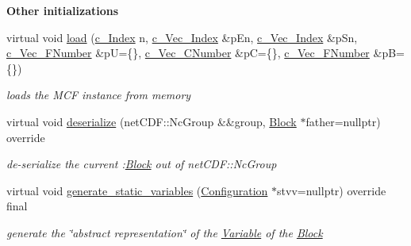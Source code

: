\begin{Indent}\textbf{ Other initializations}\par
\begin{DoxyCompactItemize}
\item 
virtual void \mbox{\hyperlink{class_s_m_spp__di__unipi__it_1_1_m_c_f_block_a8d9a0b09d14066840af26ec9189f6e03}{load}} (\mbox{\hyperlink{class_s_m_spp__di__unipi__it_1_1_m_c_f_block_aee6156e2ce80720d57a082d80f39d8cc}{c\+\_\+\+Index}} n, \mbox{\hyperlink{class_s_m_spp__di__unipi__it_1_1_m_c_f_block_a03461123d4f6090aefeb97ef653d3f2b}{c\+\_\+\+Vec\+\_\+\+Index}} \&p\+En, \mbox{\hyperlink{class_s_m_spp__di__unipi__it_1_1_m_c_f_block_a03461123d4f6090aefeb97ef653d3f2b}{c\+\_\+\+Vec\+\_\+\+Index}} \&p\+Sn, \mbox{\hyperlink{class_s_m_spp__di__unipi__it_1_1_m_c_f_block_ae74990406673bbcdf64e1a3e3b680d5c}{c\+\_\+\+Vec\+\_\+\+F\+Number}} \&pU=\{\}, \mbox{\hyperlink{class_s_m_spp__di__unipi__it_1_1_m_c_f_block_ad42538e79f9abbdf18061bccc05edcd6}{c\+\_\+\+Vec\+\_\+\+C\+Number}} \&pC=\{\}, \mbox{\hyperlink{class_s_m_spp__di__unipi__it_1_1_m_c_f_block_ae74990406673bbcdf64e1a3e3b680d5c}{c\+\_\+\+Vec\+\_\+\+F\+Number}} \&pB=\{\})
\begin{DoxyCompactList}\small\item\em loads the M\+CF instance from memory \end{DoxyCompactList}\item 
virtual void \mbox{\hyperlink{class_s_m_spp__di__unipi__it_1_1_m_c_f_block_a817e3ce47ea40c14517ec16c6b62b814}{deserialize}} (net\+C\+D\+F\+::\+Nc\+Group \&\&group, \mbox{\hyperlink{class_s_m_spp__di__unipi__it_1_1_block}{Block}} $\ast$father=nullptr) override
\begin{DoxyCompactList}\small\item\em de-\/serialize the current \+:\mbox{\hyperlink{class_s_m_spp__di__unipi__it_1_1_block}{Block}} out of net\+C\+D\+F\+::\+Nc\+Group \end{DoxyCompactList}\item 
virtual void \mbox{\hyperlink{class_s_m_spp__di__unipi__it_1_1_m_c_f_block_a599bd50cdc6123555aa4a6c4e22c996d}{generate\+\_\+static\+\_\+variables}} (\mbox{\hyperlink{class_s_m_spp__di__unipi__it_1_1_configuration}{Configuration}} $\ast$stvv=nullptr) override final
\begin{DoxyCompactList}\small\item\em generate the \char`\"{}abstract representation\char`\"{} of the \mbox{\hyperlink{class_s_m_spp__di__unipi__it_1_1_variable}{Variable}} of the \mbox{\hyperlink{class_s_m_spp__di__unipi__it_1_1_block}{Block}} \end{DoxyCompactList}\item 

\end{DoxyCompactItemize}
\end{Indent}
